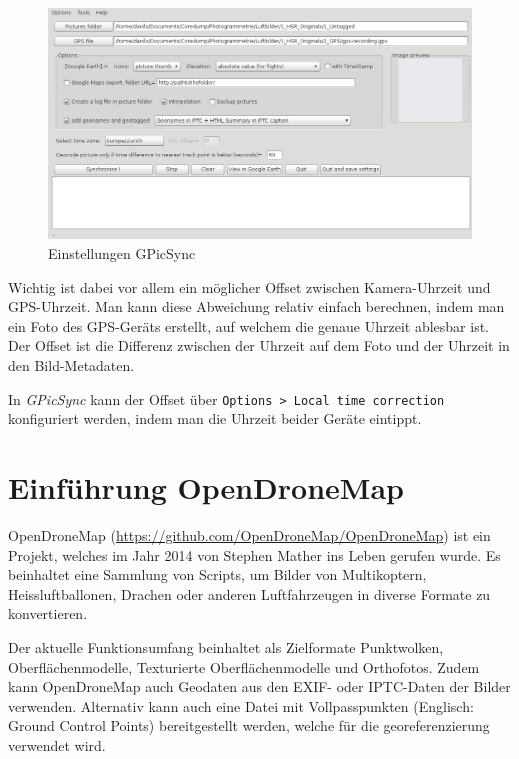 \begin{figure}[h!]
	\centering
	\includegraphics[width=\textwidth]{images/gpicsync}
	\caption{Einstellungen GPicSync}
	\label{img:gpicsync}
\end{figure}

Wichtig ist dabei vor allem ein möglicher Offset zwischen Kamera-Uhrzeit und
GPS-Uhrzeit. Man kann diese Abweichung relativ einfach berechnen, indem man ein
Foto des GPS-Geräts erstellt, auf welchem die genaue Uhrzeit ablesbar ist.
Der Offset ist die Differenz zwischen der Uhrzeit auf dem Foto und der Uhrzeit
in den Bild-Metadaten.

In \textit{GPicSync} kann der Offset über \texttt{Options > Local time
correction} konfiguriert werden, indem man die Uhrzeit beider Geräte eintippt.


\section{Einführung OpenDroneMap}

OpenDroneMap (\url{https://github.com/OpenDroneMap/OpenDroneMap}) ist ein
Projekt, welches im Jahr 2014 von Stephen Mather ins Leben gerufen
wurde\cite{smathermather:2014}. Es beinhaltet eine Sammlung von Scripts, um
Bilder von Multikoptern, Heissluftballonen, Drachen oder anderen Luftfahrzeugen
in diverse Formate zu konvertieren.

Der aktuelle Funktionsumfang beinhaltet als Zielformate Punktwolken,
Oberflächenmodelle, Texturierte Oberflächenmodelle und Orthofotos. Zudem kann
OpenDroneMap auch Geodaten aus den EXIF- oder IPTC-Daten der Bilder verwenden.
Alternativ kann auch eine Datei mit Vollpasspunkten (Englisch: Ground Control
Points) bereitgestellt werden, welche für die georeferenzierung verwendet wird.

